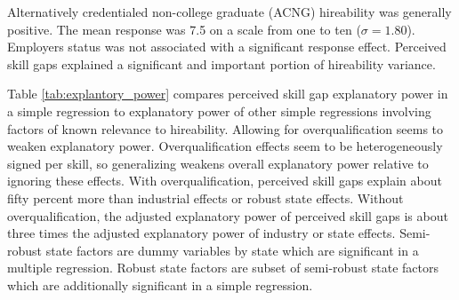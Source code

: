 \documentclass[review]{elsarticle}
\begin{document}



Alternatively credentialed non-college graduate (ACNG) hireability was generally positive.
The mean response was 7.5 on a scale from one to ten ($\sigma = 1.80$).
Employers status was not associated with a significant response effect.
Perceived skill gaps explained a significant and important portion of hireability variance.

Table \ref{tab:explantory_power} compares perceived skill gap explanatory power in a simple regression
to explanatory power of other simple regressions involving factors of known relevance to hireability.
Allowing for overqualification seems to weaken explanatory power.
Overqualification effects seem to be heterogeneously signed per skill, so generalizing weakens overall explanatory power relative to ignoring these effects.
With overqualification, perceived skill gaps explain about fifty percent more than industrial effects or robust state effects.
Without overqualification, the adjusted explanatory power of perceived skill gaps is about three times the adjusted explanatory power of industry or state effects.
Semi-robust state factors are dummy variables by state which are significant in a multiple regression.
Robust state factors are subset of semi-robust state factors which are additionally significant in a simple regression.
\end{document}
